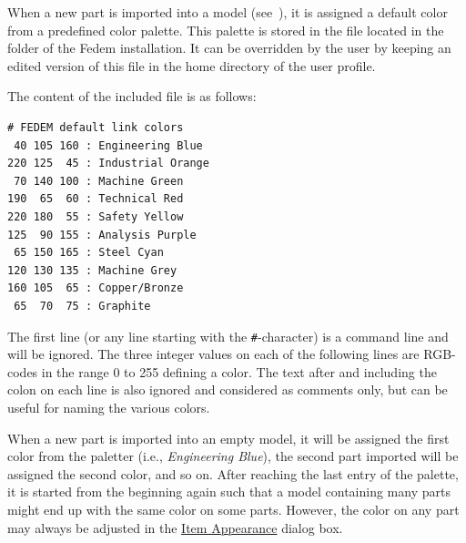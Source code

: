 

When a new part is imported into a model
(see~),
it is assigned a default color from a predefined color palette.
This palette is stored in the file 
located in the  folder of the Fedem installation.
It can be overridden by the user by keeping an edited version of this file
in the home directory of the user profile.

The content of the included  file is as follows:
%
\begin{center}
\begin{minipage}{0.8\textwidth}
\vskip1mm\begin{verbatim}
# FEDEM default link colors
 40 105 160 : Engineering Blue
220 125  45 : Industrial Orange
 70 140 100 : Machine Green
190  65  60 : Technical Red
220 180  55 : Safety Yellow
125  90 155 : Analysis Purple
 65 150 165 : Steel Cyan
120 130 135 : Machine Grey
160 105  65 : Copper/Bronze
 65  70  75 : Graphite
\end{verbatim}
\end{minipage}
\end{center}
%
The first line (or any line starting with the {\tt\#}-character)
is a command line and will be ignored.
The three integer values on each of the following lines are RGB-codes in the
range 0 to 255 defining a color.
The text after and including the colon on each line is also ignored and
considered as comments only, but can be useful for naming the various colors.

When a new part is imported into an empty model, it will be assigned the first
color from the paletter (i.e., {\sl Engineering Blue}), the second part imported
will be assigned the second color, and so on. After reaching the last entry of
the palette, it is started from the beginning again such that a model containing
many parts might end up with the same color on some parts. However,
the color on any part may always be adjusted in the
\protect\hyperlink{item-appearance}{Item Appearance} dialog box.



